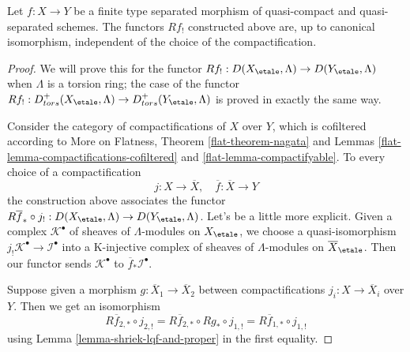 \begin{lemma}
\label{lemma-shriek-well-defined}
Let $f : X \to Y$ be a finite type separated morphism of quasi-compact
and quasi-separated schemes. The functors $Rf_!$ constructed above
are, up to canonical isomorphism, independent of the choice of the
compactification.
\end{lemma}

\begin{proof}
We will prove this for the functor
$Rf_! : D(X_\etale, \Lambda) \to D(Y_\etale, \Lambda)$
when $\Lambda$ is a torsion ring; the case of the functor
$Rf_! : D^+_{tors}(X_\etale, \Lambda) \to D^+_{tors}(Y_\etale, \Lambda)$
is proved in exactly the same way.

\medskip\noindent
Consider the category of compactifications of $X$ over $Y$, which is
cofiltered according to More on Flatness, Theorem \ref{flat-theorem-nagata} and
Lemmas \ref{flat-lemma-compactifications-cofiltered} and
\ref{flat-lemma-compactifyable}.
To every choice of a compactification
$$
j : X \to \overline{X},\quad \overline{f} : \overline{X} \to Y
$$
the construction above associates the functor $R\overline{f}_* \circ j_! :
D(X_\etale, \Lambda) \to D(Y_\etale, \Lambda)$.
Let's be a little more explicit. Given a complex $\mathcal{K}^\bullet$
of sheaves of $\Lambda$-modules on $X_\etale$, we choose a quasi-isomorphism
$j_!\mathcal{K}^\bullet \to \mathcal{I}^\bullet$ into a K-injective
complex of sheaves of $\Lambda$-modules on $\overline{X}_\etale$.
Then our functor sends $\mathcal{K}^\bullet$ to
$\overline{f}_*\mathcal{I}^\bullet$.

\medskip\noindent
Suppose given a morphism $g : \overline{X}_1 \to \overline{X}_2$
between compactifications $j_i : X \to \overline{X}_i$ over $Y$.
Then we get an isomorphism
$$
R\overline{f}_{2, *} \circ j_{2, !} =
R\overline{f}_{2, *} \circ Rg_* \circ j_{1, !} =
R\overline{f}_{1, *} \circ j_{1, !}
$$
using Lemma \ref{lemma-shriek-lqf-and-proper} in the first equality.


\end{proof}
